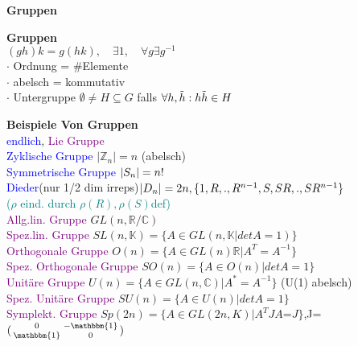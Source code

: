\documentclass[8pt, a4paper, landscape]{extarticle}
\newcommand{\tit}[1]{\textbf{#1} \\}
\newcommand{\sh}[1]{\small\textbf{#1}}
\newcommand{\pu}[1]{\textcolor{purple}{#1}}
\newcommand{\green}[1]{\textcolor{teal}{#1}}
\newcommand{\bl}[1]{\textcolor{blue}{#1}}
\begin{document}
\begin{multicols*}{5}

\begin{cbox}
    \sh{Gruppen}
\end{cbox}

\begin{ibox}
    \tit{Gruppen}
    $(gh)k=g(hk), \quad \exists 1, \quad \forall g \exists g^{-1}$\\
    $\cdot$ Ordnung = \#Elemente\\
    $\cdot$ abelsch = kommutativ\\
    $\cdot$ Untergruppe $\emptyset \neq H \subseteq G$ falls $\forall h,\Tilde{h}: h\Tilde{h}\in H$
\end{ibox}

\begin{ibox}
    \tit{Beispiele Von Gruppen}
    \textcolor{blue}{endlich}, \textcolor{purple}{Lie Gruppe}\\
    \bl{Zyklische Gruppe} $|\mathbb{Z}_n| = n$ (abelsch)\\
    \bl{Symmetrische Gruppe} $\abs{S_n}=n!$\\
    \bl{Dieder}(nur 1/2 dim irreps)$\abs{D_n}=2n, \{1,R,.,R^{n-1},S,SR,.,SR^{n-1}\}$\\
    \green{($\rho$ eind. durch $\rho(R), \rho(S)$def)}\\
    \pu{Allg.lin. Gruppe} $GL(n,\mathbb{R}/\mathbb{C})$\\
    \pu{Spez.lin. Gruppe}
    $SL(n,\mathbb{K})=\{A\in GL(n,\mathbb{K}|detA=1)\}$\\
    \pu{Orthogonale Gruppe}
    $O(n)=\{A\in GL(n)\mathbb{R}|A^T=A^{-1}\}$\\
    \pu{Spez. Orthogonale Gruppe}
    $SO(n)=\{A\in O(n)|detA=1\}$\\
    \pu{Unitäre Gruppe} $U(n)=\{A\in GL(n,\mathbb{C})|A^*=A^{-1}\}$ (U(1) abelsch)\\
    \pu{Spez. Unitäre Gruppe}
    $SU(n)=\{A\in U(n)| detA=1\}$\\
    \pu{Symplekt. Gruppe}
    $Sp(2n)=\{A$$\in$$GL(2n,K)| A^TJA$=$J\}$,J=\tiny{$(\begin{smallmatrix}
    0 & -\mathbbm{1}\\
    \mathbbm{1} & 0
    \end{smallmatrix})$}
\end{ibox}


\end{multicols*}
\end{document}
